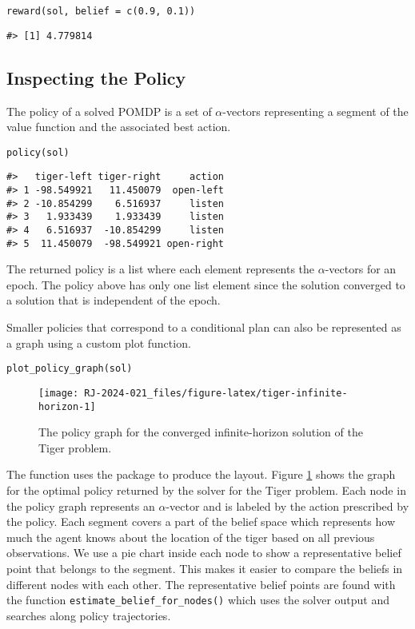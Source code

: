 \begin{verbatim}
reward(sol, belief = c(0.9, 0.1)) 
\end{verbatim}

\begin{verbatim}
#> [1] 4.779814
\end{verbatim}

\subsection{Inspecting the Policy}\label{inspecting-the-policy}

The policy of a solved POMDP is a set of \(\alpha\)-vectors
representing a segment of the value function and the
associated best action.

\begin{verbatim}
policy(sol)
\end{verbatim}

\begin{verbatim}
#>   tiger-left tiger-right     action
#> 1 -98.549921   11.450079  open-left
#> 2 -10.854299    6.516937     listen
#> 3   1.933439    1.933439     listen
#> 4   6.516937  -10.854299     listen
#> 5  11.450079  -98.549921 open-right
\end{verbatim}

The returned policy is a list where each element represents the \(\alpha\)-vectors
for an epoch. The policy above has only one list element since the solution
converged to a solution that is independent of the epoch.

Smaller policies that
correspond to a conditional plan
can also be represented as a graph using a custom plot function.

\begin{verbatim}
plot_policy_graph(sol)
\end{verbatim}

\begin{figure}
\texttt{[image: RJ-2024-021\_files/figure-latex/tiger-infinite-horizon-1]} \caption{The policy graph for the converged infinite-horizon solution of the Tiger problem.}\label{fig:tiger-infinite-horizon}
\end{figure}

The function uses the  package \citep{igraph2006} to produce the layout.
Figure \ref{fig:tiger-infinite-horizon} shows the graph for the optimal policy returned
by the solver for the Tiger problem.
Each node in the policy graph represents an \(\alpha\)-vector and is labeled by the
action prescribed by the policy.
Each segment covers a part of the belief space which represents how much the agent knows about the location of
the tiger based on all previous observations.
We use a pie chart inside each node to show a representative belief point that belongs to the segment.
This makes it easier to compare the beliefs in different nodes with each other.
The representative belief points are found with the function
\texttt{estimate\_belief\_for\_nodes()} which uses the solver output and searches along policy trajectories.

